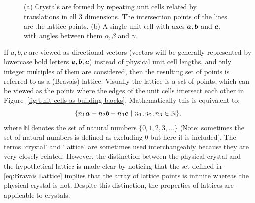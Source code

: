 \begin{figure}[H]
\begin{subfigure}[b]{0.4\textwidth}
                    \caption{}
                    \label{fig:Unit cell definition}
            \end{subfigure}
            \caption{(a) Crystals are formed by repeating unit cells related by translations in all 3 dimensions. The intersection points of the lines are the lattice points. (b) A single unit cell with axes $\boldsymbol{a}, \boldsymbol{b}$ and $\boldsymbol{c}$, with angles between them $\alpha, \beta$ and $\gamma$. \cite{drenth2012}}
    		\label{fig:Introduction-Unit Cells}
        \end{figure}
        If $a, b, c$ are viewed as directional vectors (vectors will be generally represented by lowercase bold letters {$\boldsymbol{a}, \boldsymbol{b}, \boldsymbol{c}$}) instead of physical unit cell lengths, and only integer multiples of them are considered, then the resulting set of points is referred to as a (Bravais) lattice.
        Visually the lattice is a set of points, which can be viewed as the points where the edges of the unit cells intersect each other in Figure~\ref{fig:Unit cells as building blocks}.
        Mathematically this is equivalent to:
        \begin{equation}
            \{n_1 \boldsymbol{a} + n_2 \boldsymbol{b} + n_3 \boldsymbol{c}\ |\ n_1, n_2, n_3 \in \mathbb{N} \},
            \label{eq:Bravais Lattice}
        \end{equation}
        where $\mathbb{N}$ denotes the set of natural numbers $\{ 0, 1, 2, 3,\ldots \}$ (Note: sometimes the set of natural numbers is defined as excluding 0 but here it is included).
        The terms `crystal' and `lattice' are sometimes used interchangeably because they are very closely related.
        However, the distinction between the physical crystal and the hypothetical lattice is made clear by noticing that the set defined in \ref{eq:Bravais Lattice} implies that the array of lattice points is infinite whereas the physical crystal is not.
        Despite this distinction, the properties of lattices are applicable to crystals.

